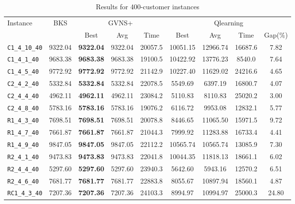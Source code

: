 \begin{table}[ht]
\centering
\small
\setlength{\tabcolsep}{5pt}
\caption{Results for 400-customer instances}
\vspace{4mm}
\begin{adjustbox}{width=\textwidth}
\begin{tabular}{l c c c c @{\hspace{8pt}} c c c c @{\hspace{8pt}}}
\toprule
\multirow{2}{*}{Instance} & \multirow{2}{*}{BKS} & \multicolumn{3}{c}{GVNS+} & \multicolumn{4}{c}{Qlearning} \\
\cmidrule(lr){3-5} \cmidrule(lr){6-9}
 &  & Best & Avg & Time & Best & Avg & Time & Gap(\%) \\
\midrule
\texttt{C1\_4\_10\_40} & 9322.04 & \textbf{9322.04} & 9322.04 & 20057.5 & 10051.15 & 12966.74 & 16687.6 & 7.82 \\
\texttt{C1\_4\_1\_40} & 9683.38 & \textbf{9683.38} & 9683.38 & 19100.5 & 10422.92 & 13776.23 & 8540.0 & 7.64 \\
\texttt{C1\_4\_5\_40} & 9772.92 & \textbf{9772.92} & 9772.92 & 21142.9 & 10227.40 & 11629.02 & 24216.6 & 4.65 \\
\texttt{C2\_4\_2\_40} & 5332.84 & \textbf{5332.84} & 5332.84 & 22078.5 & 5549.69 & 6397.19 & 16800.7 & 4.07 \\
\texttt{C2\_4\_4\_40} & 4962.11 & \textbf{4962.11} & 4962.11 & 23084.2 & 5110.83 & 8110.83 & 25020.2 & 3.00 \\
\texttt{C2\_4\_8\_40} & 5783.16 & \textbf{5783.16} & 5783.16 & 19076.2 & 6116.72 & 9953.08 & 12832.1 & 5.77 \\
\texttt{R1\_4\_3\_40} & 7698.51 & \textbf{7698.51} & 7698.51 & 20078.8 & 8446.65 & 11065.50 & 15971.5 & 9.72 \\
\texttt{R1\_4\_7\_40} & 7661.87 & \textbf{7661.87} & 7661.87 & 21044.3 & 7999.92 & 11283.88 & 16733.4 & 4.41 \\
\texttt{R1\_4\_9\_40} & 9847.05 & \textbf{9847.05} & 9847.05 & 22112.2 & 10565.74 & 10565.74 & 13085.9 & 7.30 \\
\texttt{R2\_4\_1\_40} & 9473.83 & \textbf{9473.83} & 9473.83 & 22041.8 & 10044.35 & 11818.13 & 18661.1 & 6.02 \\
\texttt{R2\_4\_4\_40} & 5297.60 & \textbf{5297.60} & 5297.60 & 23940.3 & 5642.60 & 5943.16 & 12570.2 & 6.51 \\
\texttt{R2\_4\_6\_40} & 7681.77 & \textbf{7681.77} & 7681.77 & 22883.8 & 8055.67 & 10897.94 & 18560.1 & 4.87 \\
\texttt{RC1\_4\_3\_40} & 7207.36 & \textbf{7207.36} & 7207.36 & 24103.3 & 8994.97 & 10994.97 & 25000.3 & 24.80 \\

\end{tabular}
\end{adjustbox}
\end{table}
